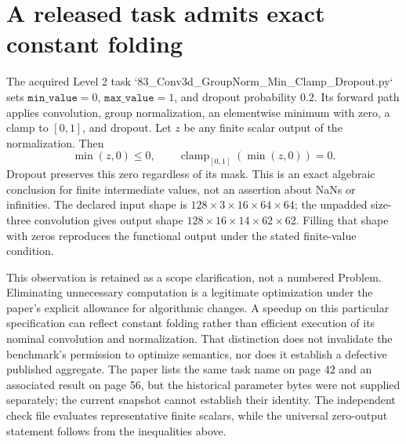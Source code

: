 \documentclass[10pt]{article}
\begin{document}
\section*{A released task admits exact constant folding}
The acquired Level 2 task `83\_Conv3d\_GroupNorm\_Min\_Clamp\_Dropout.py` sets \(\texttt{min\_value}=0\), \(\texttt{max\_value}=1\), and dropout probability \(0.2\). Its forward path applies convolution, group normalization, an elementwise minimum with zero, a clamp to \([0,1]\), and dropout. Let \(z\) be any finite scalar output of the normalization. Then \[\min(z,0)\le0,\qquad
 \operatorname{clamp}_{[0,1]}(\min(z,0))=0.\] Dropout preserves this zero regardless of its mask. This is an exact algebraic conclusion for finite intermediate values, not an assertion about NaNs or infinities. The declared input shape is \(128\times3\times16\times64\times64\); the unpadded size-three convolution gives output shape \(128\times16\times14\times62\times62\). Filling that shape with zeros reproduces the functional output under the stated finite-value condition.\par
This observation is retained as a scope clarification, not a numbered Problem. Eliminating unnecessary computation is a legitimate optimization under the paper’s explicit allowance for algorithmic changes. A speedup on this particular specification can reflect constant folding rather than efficient execution of its nominal convolution and normalization. That distinction does not invalidate the benchmark’s permission to optimize semantics, nor does it establish a defective published aggregate. The paper lists the same task name on page 42 and an associated result on page 56, but the historical parameter bytes were not supplied separately; the current snapshot cannot establish their identity. The independent check file evaluates representative finite scalars, while the universal zero-output statement follows from the inequalities above.\par
\end{document}
